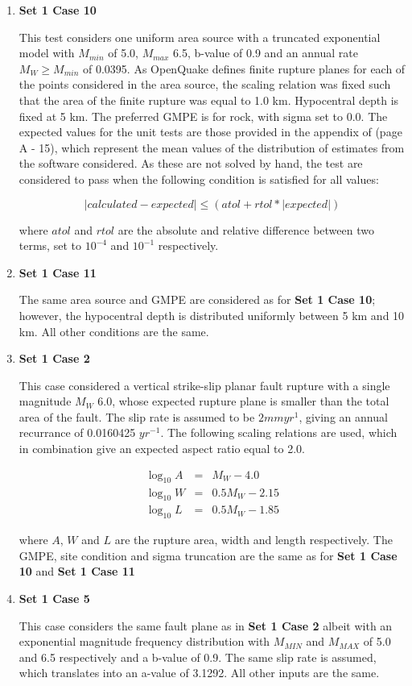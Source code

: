 \begin{enumerate}
\item \textbf{Set 1 Case 10} 

This test considers one uniform area source with a truncated exponential model with $M_{min}$ of 5.0, $M_{max}$ 6.5, b-value of 0.9 and an annual rate $M_W \geq M_{min}$ of 0.0395. As OpenQuake defines finite rupture planes for each of the points considered in the area source, the scaling relation was fixed such that the area of the finite rupture was equal to 1.0 km. Hypocentral depth is fixed at 5 km. The preferred GMPE is \cite{sEtAl1997} for rock, with sigma set to 0.0. The expected values for the unit tests are those provided in the appendix of \cite{thomas2010} (page A - 15), which represent the mean values of the distribution of estimates from the software considered. As these are not solved by hand, the test are considered to pass when the following condition is satisfied for all values:

\begin{equation}
|calculated - expected| \leq \left( {atol + rtol * |expected|} \right)
\end{equation}

where $atol$ and $rtol$ are the absolute and relative difference between two terms, set to $10^{-4}$ and $10^{-1}$ respectively.

\item \textbf{Set 1 Case 11}

The same area source and GMPE are considered as for \textbf{Set 1 Case 10}; however, the hypocentral depth is distributed uniformly between 5 km and 10 km. All other conditions are the same.


\item \textbf{Set 1 Case 2}

This case considered a vertical strike-slip planar fault rupture with a single magnitude $M_W$ 6.0, whose expected rupture plane is smaller than the total area of the fault. The slip rate is assumed to be $2 mm yr^{1}$, giving an annual recurrance of 0.0160425 $yr^{-1}$. The following scaling relations are used, which in combination give an expected aspect ratio equal to 2.0.

\begin{eqnarray}
\log_{10} A &=& M_W - 4.0\\
\log_{10} W &=& 0.5 M_W - 2.15\\
\log_{10} L &=& 0.5 M_W - 1.85
\end{eqnarray}

where $A$, $W$ and $L$ are the rupture area, width and length respectively. The GMPE, site condition and sigma truncation are the same as for \textbf{Set 1 Case 10} and \textbf{Set 1 Case 11}


\item \textbf{Set 1 Case 5}

This case considers the same fault plane as in \textbf{Set 1 Case 2} albeit with an exponential magnitude frequency distribution with $M_{MIN}$ and $M_{MAX}$ of 5.0 and 6.5 respectively and a b-value of 0.9. The same slip rate is assumed, which translates into an a-value of 3.1292. All other inputs are the same.
\end{enumerate}


